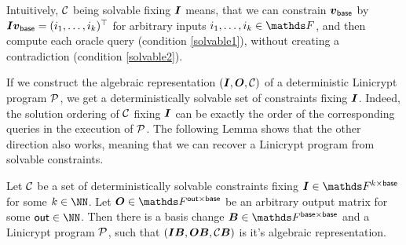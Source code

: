 Intuitively, $\C$ being solvable fixing $\I$ means,
that we can constrain $\vbase$ by $\Inp \vbase = (i_1, \dots, i_k)^\top$ for arbitrary inputs $i_1, \dots, i_k \in \F$,
and then compute each oracle query (condition \ref{solvable1}),
without creating a contradiction (condition \ref{solvable2}).


If we construct the algebraic representation $(\I, \O, \C)$ of a deterministic Linicrypt program $\P$,
we get a deterministically solvable set of constraints fixing $\I$.
Indeed, the solution ordering of $\C$ fixing $\I$
can be exactly the order of the corresponding queries in the execution of $\P$.
The following Lemma shows that the other direction also works,
meaning that we can recover a Linicrypt program from solvable constraints.

\begin{lemma}
\label{det_solvable_lemma}
    Let $\C$ be a set of deterministically solvable constraints fixing $\Inp \in \F^{k \times \base}$ for some $k \in \NN$.
    Let $\O \in \F^{\out \times \base}$ be an arbitrary output matrix for some $\out \in \NN$.
    Then there is a basis change $\B \in \F^{\base \times \base}$
    and a Linicrypt program $\P$,
    such that $(\Inp \B, \O \B, \C \B)$ is it's algebraic representation.
\end{lemma}

